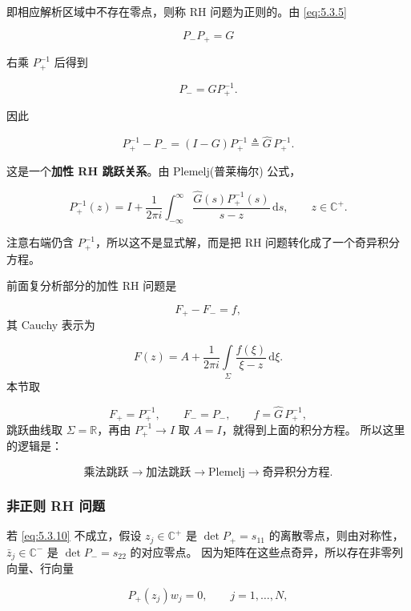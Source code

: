\documentclass[
    lang=cn,
    scheme=chinese,
    mode=simple,
    device=normal,
    color=blue,
    math=cm,
    thmcnt=section,
    12pt
]{elegantbook}
\begin{document}
即相应解析区域中不存在零点，则称 RH 问题为正则的。由 \eqref{eq:5.3.5}

\[
    P_-P_+=G
\]

右乘 $P_+^{-1}$ 后得到

\[
    P_-=GP_+^{-1}.
\]

因此

\[
    P_+^{-1}-P_-
    =
    (I-G)P_+^{-1}
    \triangleq
    \widehat G\,P_+^{-1}.
\]

这是一个\textbf{加性 RH 跳跃关系}。由 Plemelj(普莱梅尔) 公式，

\[
    P_+^{-1}(z)
    =
    I+
    \dfrac{1}{2\pi i}
    \int_{-\infty}^{\infty}
    \dfrac{\widehat G(s)P_+^{-1}(s)}{s-z}\,\mathrm ds,
    \qquad
    z\in\mathbb{C}^+.
\]

注意右端仍含 $P_+^{-1}$，所以这不是显式解，而是把 RH 问题转化成了一个奇异积分方程。

\begin{callout}
    前面复分析部分的加性 RH 问题是

    \[
        F_+-F_-=f,
    \]
    其 Cauchy 表示为

    \[
        F(z)
        =
        A+
        \dfrac{1}{2\pi i}
        \int\limits_\Sigma
        \dfrac{f(\xi)}{\xi-z}\,\mathrm d\xi.
    \]
    本节取

    \[
        F_+=P_+^{-1},
        \qquad
        F_-=P_-,
        \qquad
        f=\widehat G\,P_+^{-1},
    \]
    跳跃曲线取 $\Sigma=\mathbb{R}$，再由 $P_+^{-1}\to I$ 取 $A=I$，就得到上面的积分方程。
    所以这里的逻辑是：

    \[
        \text{乘法跳跃}
        \longrightarrow
        \text{加法跳跃}
        \longrightarrow
        \text{Plemelj}
        \longrightarrow
        \text{奇异积分方程}.
    \]

\end{callout}

\subsubsection{非正则 RH 问题}

若 \eqref{eq:5.3.10} 不成立，假设 $z_j\in\mathbb{C}^+$ 是 $\det P_+=s_{11}$ 的离散零点，则由对称性，$\bar z_j\in\mathbb{C}^-$ 是 $\det P_-=s_{22}$ 的对应零点。
因为矩阵在这些点奇异，所以存在非零列向量、行向量

\begin{equation}
    P_+(z_j)w_j=0,
    \qquad j=1,\ldots,N,
    \tag{5.3.11}
    \label{eq:5.3.11}
\end{equation}
\end{document}
